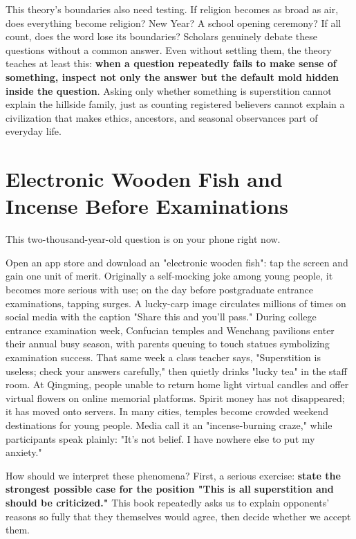 This theory's boundaries also need testing. If religion becomes as broad as air, does everything become religion? New Year? A school opening ceremony? If all count, does the word lose its boundaries? Scholars genuinely debate these questions without a common answer. Even without settling them, the theory teaches at least this: \textbf{when a question repeatedly fails to make sense of something, inspect not only the answer but the default mold hidden inside the question}. Asking only whether something is superstition cannot explain the hillside family, just as counting registered believers cannot explain a civilization that makes ethics, ancestors, and seasonal observances part of everyday life.

\section[Digital Rituals and Exam Incense]{Electronic Wooden Fish and Incense Before Examinations}
This two-thousand-year-old question is on your phone right now.

Open an app store and download an "electronic wooden fish": tap the screen and gain one unit of merit. Originally a self-mocking joke among young people, it becomes more serious with use; on the day before postgraduate entrance examinations, tapping surges. A lucky-carp image circulates millions of times on social media with the caption "Share this and you'll pass." During college entrance examination week, Confucian temples and Wenchang pavilions enter their annual busy season, with parents queuing to touch statues symbolizing examination success. That same week a class teacher says, "Superstition is useless; check your answers carefully," then quietly drinks "lucky tea" in the staff room. At Qingming, people unable to return home light virtual candles and offer virtual flowers on online memorial platforms. Spirit money has not disappeared; it has moved onto servers. In many cities, temples become crowded weekend destinations for young people. Media call it an "incense-burning craze," while participants speak plainly: "It's not belief. I have nowhere else to put my anxiety."

How should we interpret these phenomena? First, a serious exercise: \textbf{state the strongest possible case for the position "This is all superstition and should be criticized."} This book repeatedly asks us to explain opponents' reasons so fully that they themselves would agree, then decide whether we accept them.

